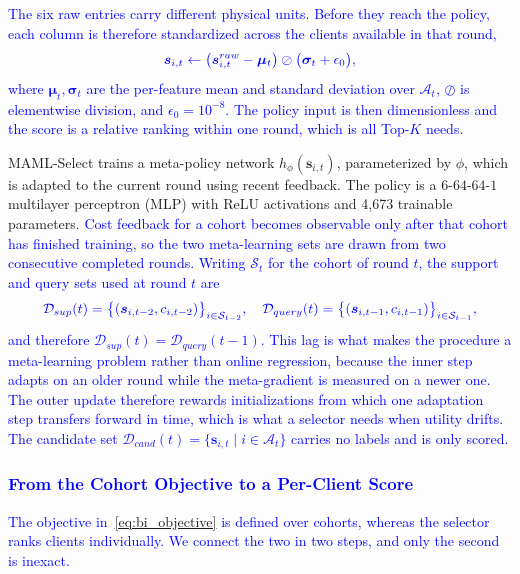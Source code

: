 \documentclass[journal]{IEEEtran}
\theoremstyle{remark}
\newcommand{\revision}[1]{#1}
\newcommand{\revtwo}[1]{\textcolor{blue}{#1}}
\newcommand{\revtwoeq}{\color{blue}}
\begin{document}
\revtwo{The six raw entries carry different physical units. Before they reach the policy, each column is therefore standardized across the clients available in that round,}
\begin{equation}
	\revtwoeq
	\bm{s}_{i,t} \leftarrow \bigl(\bm{s}^{raw}_{i,t}-\bm{\mu}_t\bigr)\oslash\bigl(\bm{\sigma}_t+\epsilon_0\bigr),
	\label{eq:zscore}
\end{equation}
\revtwo{where $\bm{\mu}_t,\bm{\sigma}_t$ are the per-feature mean and standard deviation over $\mathcal{A}_t$, $\oslash$ is elementwise division, and $\epsilon_0=10^{-8}$. The policy input is then dimensionless and the score is a relative ranking within one round, which is all Top-$K$ needs.}

MAML-Select trains a meta-policy network $h_\phi(\bm{s}_{i,t})$, parameterized by $\phi$, which is adapted to the current round using recent feedback. \revision{The policy is a $6$-$64$-$64$-$1$ multilayer perceptron (MLP) with ReLU activations and 4,673 trainable parameters.} \revtwo{Cost feedback for a cohort becomes observable only after that cohort has finished training, so the two meta-learning sets are drawn from two consecutive completed rounds. Writing $\mathcal{S}_t$ for the cohort of round $t$, the support and query sets used at round $t$ are}
\begin{equation}
	\revtwoeq \mathcal{D}_{sup}(t) = \bigl\{(\bm{s}_{i,t-2},c_{i,t-2})\bigr\}_{i\in\mathcal{S}_{t-2}},\quad
	\mathcal{D}_{query}(t) = \bigl\{(\bm{s}_{i,t-1},c_{i,t-1})\bigr\}_{i\in\mathcal{S}_{t-1}} ,
	\label{eq:sets}
\end{equation}
\revtwo{and therefore $\mathcal{D}_{sup}(t)=\mathcal{D}_{query}(t-1)$. This lag is what makes the procedure a meta-learning problem rather than online regression, because the inner step adapts on an older round while the meta-gradient is measured on a newer one. The outer update therefore rewards initializations from which one adaptation step transfers forward in time, which is what a selector needs when utility drifts. The candidate set $\mathcal{D}_{cand}(t)=\{\bm{s}_{i,t}\mid i\in\mathcal{A}_t\}$ carries no labels and is only scored.}

\subsubsection{\revtwo{From the Cohort Objective to a Per-Client Score}}
\revtwo{The objective in~\eqref{eq:bi_objective} is defined over cohorts, whereas the selector ranks clients individually. We connect the two in two steps, and only the second is inexact.}
\end{document}
